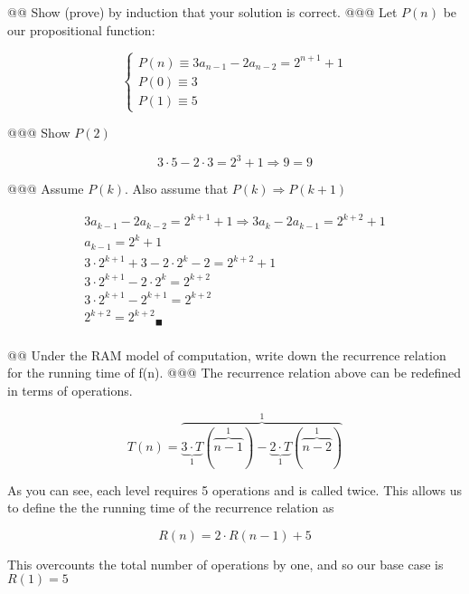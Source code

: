 \documentclass[10pt]{article}
\begin{document}
\begin{easylist}[enumerate]
    @@ Show (prove) by induction that your solution is correct.
    @@@ Let $P(n)$ be our propositional function:

        \[ \begin{cases}
            P(n) \equiv 3 a_{n-1} - 2 a_{n-2} = 2^{n+1} + 1\\
            P(0) \equiv 3\\
            P(1) \equiv 5
        \end{cases} \]

    @@@ Show $P(2)$

        \[ 3 \cdot 5 - 2 \cdot 3 = 2^{3} + 1 \Rightarrow 9 = 9 \]

    @@@ Assume $P(k)$. Also assume that $P(k) \Rightarrow P(k + 1)$

        \[ \begin{aligned}
                3 a_{k-1} - 2 a_{k-2} = 2^{k+1} + 1 \Rightarrow 3 a_{k} - 2 a_{k-1} = 2^{k+2} + 1\\
                a_{k-1} = 2^k + 1\\
                3 \cdot 2^{k + 1} + 3 - 2 \cdot 2^k - 2 = 2^{k+2} + 1\\
                3 \cdot 2^{k+1} - 2 \cdot 2^k = 2^{k+2}\\
                3 \cdot 2^{k+1} - 2^{k+1} = 2^{k+2}\\
                {2^{k+2} = 2^{k+2} }_\blacksquare\\
            \end{aligned} \]

    @@ Under the {\ttfamily RAM} model of computation, write down the recurrence relation for the running time of {\ttfamily f(n)}.
    @@@ The recurrence relation above can be redefined in terms of operations.

        \[ T(n) = \overbrace{\underbrace{3 \cdot T}_1 (\overbrace{n-1}^1) - \underbrace{2 \cdot T}_1 (\overbrace{n-2}^1)}^{1} \]

        As you can see, each level requires 5 operations and is called twice. This allows us to define the the running time of the recurrence relation as

        \[ R(n) = 2 \cdot R(n - 1) + 5 \]

        This overcounts the total number of operations by one, and so our base case is $R(1) = 5$


\end{easylist}
\end{document}
